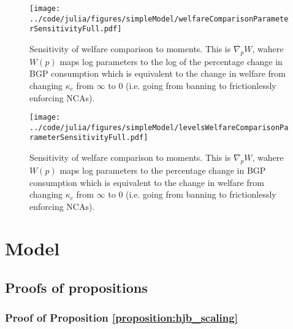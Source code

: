 \documentclass[11pt,english]{article}
\begin{document}
\begin{figure}[]
	\texttt{[image: ../code/julia/figures/simpleModel/welfareComparisonParameterSensitivityFull.pdf]}
	\caption{Sensitivity of welfare comparison to moments. This is $\nabla_p W$, wahere $W(p)$ maps log parameters to the log of the percentage change in BGP consumption which is equivalent to the change in welfare from changing $\kappa_c$ from $\infty$ to $0$ (i.e. going from banning to frictionlessly enforcing NCAs).}
	\label{welfareComparisonParameterSensitivityFull}
\end{figure}

\begin{figure}[]
	\texttt{[image: ../code/julia/figures/simpleModel/levelsWelfareComparisonParameterSensitivityFull.pdf]}
	\caption{Sensitivity of welfare comparison to moments. This is $\nabla_p W$, wahere $W(p)$ maps log parameters to the percentage change in BGP consumption which is equivalent to the change in welfare from changing $\kappa_c$ from $\infty$ to $0$ (i.e. going from banning to frictionlessly enforcing NCAs).}
	\label{levelsWelfareComparisonParameterSensitivityFull}
\end{figure}

\section{Model}\label{appendix:model}

\subsection{Proofs of propositions}

\subsubsection{Proof of Proposition \ref{proposition:hjb_scaling}}\label{appendix:proofs:proposition:hjb_scaling}
\end{document}
